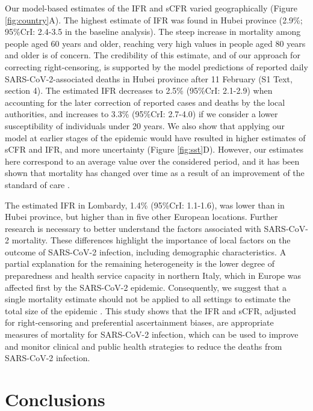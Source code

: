 \documentclass{article}
\begin{document}
Our model-based estimates of the IFR and sCFR varied geographically (Figure \ref{fig:country}A). 
The highest estimate of IFR was found in Hubei province (2.9\%; 95\%CrI: 2.4-3.5 in the baseline analysis).
The steep increase in mortality among people aged 60 years and older, reaching very high values in people aged 80 years and older is of concern. 
The credibility of this estimate, and of our approach for correcting right-censoring, is supported by the model predictions of reported daily SARS-CoV-2-associated deaths in Hubei province after 11 February (S1 Text, section 4). 
The estimated IFR decreases to 2.5\% (95\%CrI: 2.1-2.9) when accounting for the later correction of reported cases and deaths by the local authorities, and increases to 3.3\% (95\%CrI: 2.7-4.0) if we consider a lower susceptibility of individuals under 20 years. 
We also show that applying our model at earlier stages of the epidemic would have resulted in higher estimates of sCFR and IFR, and more uncertainty (Figure \ref{fig:sst}D). 
However, our estimates here correspond to an average value over the considered period, and it has been shown that mortality has changed over time as a result of an improvement of the standard of care \cite{jointmission}. 

The estimated IFR in Lombardy, 1.4\% (95\%CrI: 1.1-1.6), was lower than in Hubei province, but higher than in five other European locations. 
Further research is necessary to better understand the factors associated with SARS-CoV-2 mortality. 
These differences highlight the importance of local factors on the outcome of SARS-CoV-2 infection, including demographic characteristics. 
A partial explanation for the remaining heterogeneity is the lower degree of preparedness and health service capacity in northern Italy, which in Europe was affected first by the SARS-CoV-2 epidemic. 
Consequently, we suggest that a single mortality estimate should not be applied to all settings to estimate the total size of the epidemic \cite{flaxman2020report}. 
This study shows that the IFR and sCFR, adjusted for right-censoring and preferential ascertainment biases, are appropriate measures of mortality for SARS-CoV-2 infection, which can be used to improve and monitor clinical and public health strategies to reduce the deaths from SARS-CoV-2 infection. 


\section*{Conclusions}
\end{document}
